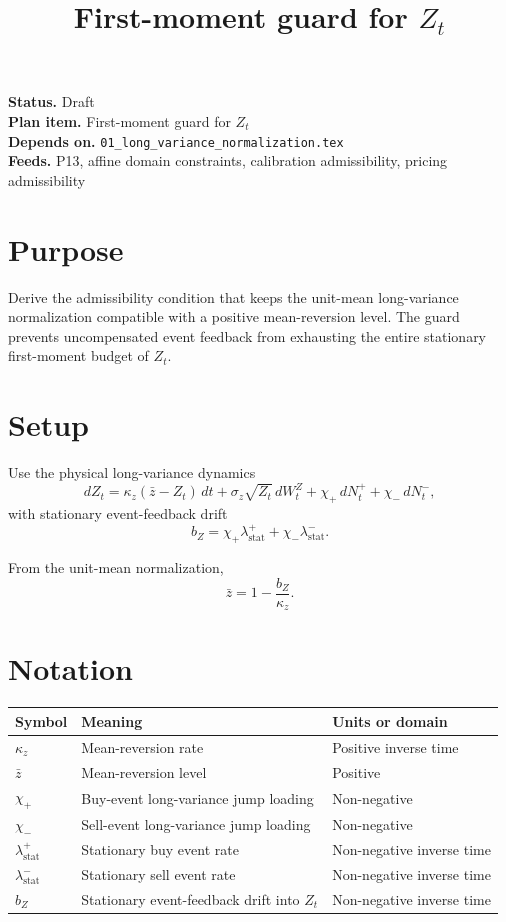 \documentclass[11pt]{article}
\title{First-moment guard for \(Z_t\)}
\author{}
\date{}
\begin{document}
\maketitle

\noindent\textbf{Status.} Draft\\
\textbf{Plan item.} First-moment guard for \(Z_t\)\\
\textbf{Depends on.} \texttt{01\_long\_variance\_normalization.tex}\\
\textbf{Feeds.} P13, affine domain constraints, calibration admissibility, pricing admissibility

\section{Purpose}

Derive the admissibility condition that keeps the unit-mean long-variance
normalization compatible with a positive mean-reversion level.
The guard prevents uncompensated event feedback from exhausting the entire
stationary first-moment budget of \(Z_t\).

\section{Setup}

Use the physical long-variance dynamics
\[
    dZ_t
    =
    \kappa_z(\bar z-Z_t)\,dt
    +\sigma_z\sqrt{Z_t}\,dW_t^Z
    +\chi_+\,dN_t^+
    +\chi_-\,dN_t^-,
\]
with stationary event-feedback drift
\[
    b_Z
    =
    \chi_+\lambda_{\mathrm{stat}}^+
    +\chi_-\lambda_{\mathrm{stat}}^-.
\]

From the unit-mean normalization,
\[
    \bar z=1-\frac{b_Z}{\kappa_z}.
\]

\section{Notation}

\begin{tabularx}{\textwidth}{lXX}
\toprule
Symbol & Meaning & Units or domain\\
\midrule
\(\kappa_z\) & Mean-reversion rate & Positive inverse time\\
\(\bar z\) & Mean-reversion level & Positive\\
\(\chi_+\) & Buy-event long-variance jump loading & Non-negative\\
\(\chi_-\) & Sell-event long-variance jump loading & Non-negative\\
\(\lambda_{\mathrm{stat}}^+\) & Stationary buy event rate & Non-negative inverse time\\
\(\lambda_{\mathrm{stat}}^-\) & Stationary sell event rate & Non-negative inverse time\\
\(b_Z\) & Stationary event-feedback drift into \(Z_t\) & Non-negative inverse time\\
\bottomrule
\end{tabularx}
\end{document}
